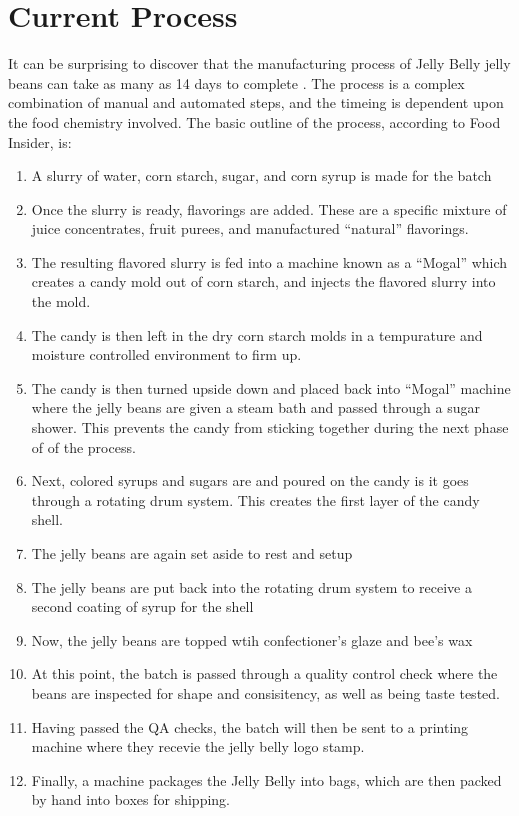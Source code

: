 \section{Current Process}

It can be surprising to discover that the manufacturing process of Jelly Belly jelly beans can take as many as 14 days to complete \parencite{foodinsiderHowJellyBelly2019a}. The process is a complex combination of manual and automated steps, and the timeing is dependent upon the food chemistry involved. The basic outline of the process, according to Food Insider, is:


\begin{enumerate}
  \item A slurry of water, corn starch, sugar, and corn syrup is made for the batch
  \item Once the slurry is ready, flavorings are added. These are a specific mixture of juice concentrates, fruit purees, and manufactured ``natural'' flavorings.
  \item The resulting flavored slurry is fed into a machine known as a ``Mogal'' which creates a candy mold out of corn starch, and injects the flavored slurry into the mold.
  \item The candy is then left in the dry corn starch molds in a tempurature and moisture controlled environment to firm up.
  \item The candy is then turned upside down and placed back into ``Mogal'' machine where the jelly beans are given a steam bath and passed through a sugar shower. This prevents the candy from sticking together during the next phase of of the process.
  \item Next, colored syrups and sugars are and poured on the candy is it goes through a rotating drum system. This creates the first layer of the candy shell.
  \item The jelly beans are again set aside to rest and setup
  \item The jelly beans are put back into the rotating drum system to receive a second coating of syrup for the shell
  \item Now, the jelly beans are topped wtih confectioner's glaze and bee's wax
  \item At this point, the batch is passed through a quality control check where the beans are inspected for shape and consisitency, as well as being taste tested.
  \item Having passed the QA checks, the batch will then be sent to a printing machine where they recevie the jelly belly logo stamp.
  \item Finally, a machine packages the Jelly Belly into bags, which are then packed by hand into boxes for shipping.
\end{enumerate}

